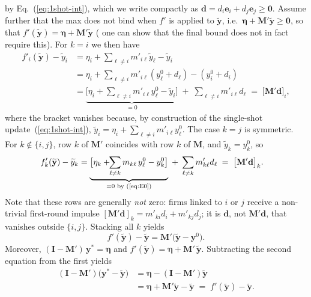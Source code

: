 by Eq.~(\ref{eq:1shot-int}), which we write compactly as $\mathbf d=d_i\mathbf e_i+d_j\mathbf e_j\ge\mathbf 0$. Assume further that the max does not bind when $f'$ is applied to $\widetilde{\mathbf y}$, i.e.\ $\boldsymbol{\eta}+\mathbf M'\widetilde{\mathbf y}\ge\mathbf 0$, so that
$f'(\widetilde{\mathbf y})=\boldsymbol{\eta}+\mathbf M'\widetilde{\mathbf y}$
(%
one can show that the final bound does not in fact require this). For $k=i$ we then have
\begin{align*}
f'_i(\widetilde{\mathbf y})-\widetilde y_i
 &=\eta_i+\!\!\sum_{\ell\neq i}m'_{i\ell}\widetilde y_{\ell}-\widetilde y_i\\
 &=\eta_i+\!\!\sum_{\ell\neq i}m'_{i\ell}(y^{0}_{\ell}+d_{\ell})
          -(y^{0}_{i}+d_i)\\
 &=\underbrace{\bigl[\eta_i+\!\!\sum_{\ell\neq i}m'_{i\ell}y^{0}_{\ell}
                    -\widetilde y_{i}\bigr]}_{=0}
   \;+\;
   \sum_{\ell\neq i}m'_{i\ell}d_{\ell}
   \;=\;\bigl[\mathbf M'\mathbf d\bigr]_i,
\end{align*}
where the bracket vanishes because, by construction of the single-shot update~(\ref{eq:1shot-int}), $\widetilde y_i=\eta_i+\sum_{\ell\ne i}m'_{i\ell}y^{0}_\ell$. The case $k=j$ is symmetric. For $k\notin\{i,j\}$, row $k$ of $\mathbf M'$ coincides with row $k$ of $\mathbf M$, and $\widetilde y_k=y^{0}_k$, so
\begin{align*}
f'_k(\widetilde{\mathbf y})-\widetilde y_k
 &=\underbrace{\bigl[\eta_k+\!\!\sum_{\ell\neq k}m_{k\ell}\,y^{0}_{\ell}
                    -y^{0}_{k}\bigr]}_{=0 \text{ by (\ref{eq:E0})}}
   \;+\;
   \sum_{\ell\neq k}m'_{k\ell}d_{\ell}
   \;=\;\bigl[\mathbf M'\mathbf d\bigr]_k .
\end{align*}
Note that these rows are generally \emph{not} zero: firms linked to $i$ or $j$ receive a non-trivial first-round impulse $[\mathbf M'\mathbf d]_k=m'_{ki}d_i+m'_{kj}d_j$; it is $\mathbf d$, not $\mathbf M'\mathbf d$, that vanishes outside $\{i,j\}$. Stacking all $k$ yields
\begin{equation}
f'(\widetilde{\mathbf y})-\widetilde{\mathbf y}
   =\mathbf M'\bigl(\widetilde{\mathbf y}-\mathbf y^{0}\bigr).
\label{eq:one-step-residual}
\end{equation}
Moreover, $(\mathbf I-\mathbf M')\,\mathbf y^{\ast} = \boldsymbol{\eta}$ and $f'(\widetilde{\mathbf y}) = \boldsymbol{\eta} + \mathbf M'\,\widetilde{\mathbf y}$. Subtracting the second equation from the first yields
\[
\begin{aligned}
(\mathbf I-\mathbf M')\bigl(\mathbf y^{\ast}-\widetilde{\mathbf y}\bigr)
   &= \boldsymbol{\eta}
      -(\mathbf I-\mathbf M')\widetilde{\mathbf y} \\[4pt]
   &= \boldsymbol{\eta}
      +\mathbf M'\widetilde{\mathbf y}
      -\widetilde{\mathbf y}
   \;=\; f'(\widetilde{\mathbf y}) - \widetilde{\mathbf y}.
\end{aligned}
\]

